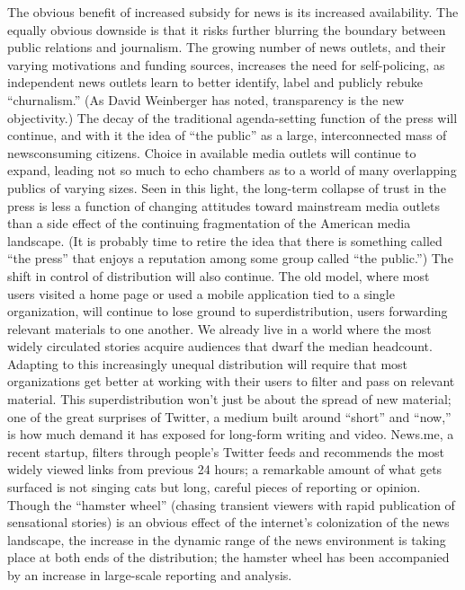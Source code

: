 The obvious benefit of increased subsidy for news is its increased availability. The
equally obvious downside is that it risks further blurring the boundary between
public relations and journalism. The growing number of news outlets, and their
varying motivations and funding sources, increases the need for self-policing, as
independent news outlets learn to better identify, label and publicly rebuke ``churnalism.''
(As David Weinberger has noted, transparency is the new objectivity.)
The decay of the traditional agenda-setting function of the press will continue,
and with it the idea of ``the public'' as a large, interconnected mass of newsconsuming
citizens. Choice in available media outlets will continue to expand,
leading not so much to echo chambers as to a world of many overlapping publics
of varying sizes. Seen in this light, the long-term collapse of trust in the press
is less a function of changing attitudes toward mainstream media outlets than a
side effect of the continuing fragmentation of the American media landscape. (It
is probably time to retire the idea that there is something called ``the press'' that
enjoys a reputation among some group called ``the public.'')
The shift in control of distribution will also continue. The old model, where
most users visited a home page or used a mobile application tied to a single organization,
will continue to lose ground to superdistribution, users forwarding relevant
materials to one another. We already live in a world where the most widely
circulated stories acquire audiences that dwarf the median headcount. Adapting
to this increasingly unequal distribution will require that most organizations get
better at working with their users to filter and pass on relevant material.
This superdistribution won’t just be about the spread of new material; one of the
great surprises of Twitter, a medium built around ``short'' and ``now,'' is how much
demand it has exposed for long-form writing and video. News.me, a recent
startup, filters through people’s Twitter feeds and recommends the most widely
viewed links from previous 24 hours; a remarkable amount of what gets surfaced
is not singing cats but long, careful pieces of reporting or opinion.
Though the ``hamster wheel'' (chasing transient viewers with rapid publication of
sensational stories) is an obvious effect of the internet’s colonization of the news
landscape, the increase in the dynamic range of the news environment is taking
place at both ends of the distribution; the hamster wheel has been accompanied
by an increase in large-scale reporting and analysis.

